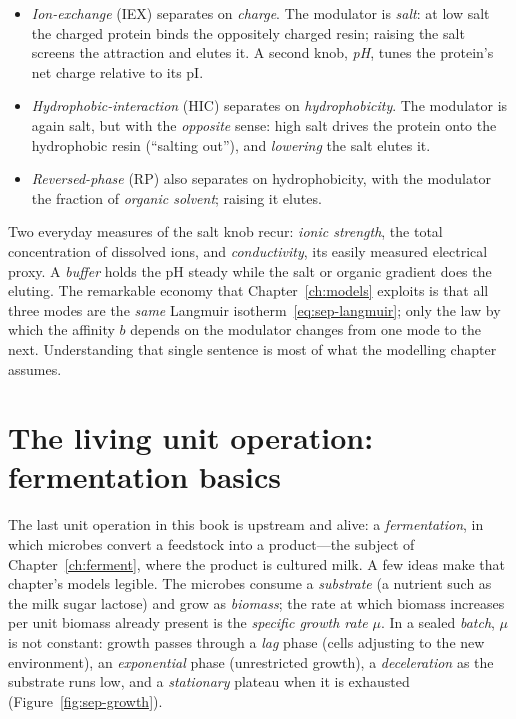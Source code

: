 \begin{itemize}
  \item \emph{Ion-exchange} (IEX) separates on \emph{charge}. The modulator is
  \emph{salt}: at low salt the charged protein binds the oppositely charged
  resin; raising the salt screens the attraction and elutes it. A second knob,
  \emph{pH}, tunes the protein's net charge relative to its pI.
  \item \emph{Hydrophobic-interaction} (HIC) separates on \emph{hydrophobicity}.
  The modulator is again salt, but with the \emph{opposite} sense: high salt
  drives the protein onto the hydrophobic resin (``salting out''), and
  \emph{lowering} the salt elutes it.
  \item \emph{Reversed-phase} (RP) also separates on hydrophobicity, with the
  modulator the fraction of \emph{organic solvent}; raising it elutes.
\end{itemize}
%
Two everyday measures of the salt knob recur: \emph{ionic strength}, the total
concentration of dissolved ions, and \emph{conductivity}, its easily measured
electrical proxy. A \emph{buffer} holds the pH steady while the salt or organic
gradient does the eluting. The remarkable economy that Chapter~\ref{ch:models}
exploits is that all three modes are the \emph{same} Langmuir
isotherm~\eqref{eq:sep-langmuir}; only the law by which the affinity $b$ depends
on the modulator changes from one mode to the next. Understanding that single
sentence is most of what the modelling chapter assumes.

\section{The living unit operation: fermentation basics}
\label{sec:sep-fermentation}

The last unit operation in this book is upstream and alive: a
\emph{fermentation}, in which microbes convert a feedstock into a product---the
subject of Chapter~\ref{ch:ferment}, where the product is cultured milk. A few
ideas make that chapter's models legible. The microbes consume a
\emph{substrate} (a nutrient such as the milk sugar lactose) and grow as
\emph{biomass}; the rate at which biomass increases per unit biomass already
present is the \emph{specific growth rate} $\mu$. In a sealed \emph{batch}, $\mu$
is not constant: growth passes through a \emph{lag} phase (cells adjusting to the
new environment), an \emph{exponential} phase (unrestricted growth), a
\emph{deceleration} as the substrate runs low, and a \emph{stationary} plateau
when it is exhausted (Figure~\ref{fig:sep-growth}).


